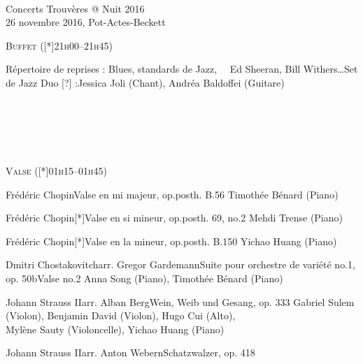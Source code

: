 \documentclass[a4paper,11pt,poets,durations]{ConcProg}
\begin{document}
{
\selectfont

~\\

\begin{programme}{
    Concerts Trouvères @ Nuit 2016
\\  {\normalsize 26 novembre 2016, Pot-Actes-Beckett}
}
~\\
\begin{center}
\textsc{Buffet ([*]21h00--21h45)}
\end{center}
  \begin{part}[]
    \begin{composition}{Répertoire de reprises : Blues, standards de Jazz, ~~Ed Sheeran, Bill Withers\dots}{}{Set de Jazz}{}
      {\small Duo [?] :\newline Jessica Joli (Chant), Andréa Baldoffei (Guitare)}
    \end{composition}\\
~\\
~\\
~\\
\begin{center}
\textsc{Valse ([*]01h15--01h45)}
\end{center}
    \begin{composition}{Frédéric Chopin}{}{Valse en mi majeur, op.posth. B.56}{}
      {\small Timothée Bénard (Piano)}
    \end{composition}
    \begin{composition}{Frédéric Chopin}{}{[*]Valse en si mineur, op.posth. 69, no.2}{}
      {\small Mehdi Trense (Piano)}
    \end{composition}
    \begin{composition}{Frédéric Chopin}{}{[*]Valse en la mineur, op.posth. B.150}{}
      {\small Yichao Huang (Piano)}
    \end{composition}
    \begin{composition}{Dmitri Chostakovitch}{arr. Gregor Gardemann}{Suite pour orchestre de variété no.1, op. 50b}{Valse no.2}
      {\small Anna Song (Piano), Timothée Bénard (Piano)}
    \end{composition}
    \begin{composition}{Johann Strauss II}{arr. Alban Berg}{Wein, Weib und Gesang, op. 333}{}
      {\small Gabriel Sulem (Violon), Benjamin David (Violon), Hugo Cui (Alto),\\Mylène Sauty (Violoncelle), Yichao Huang (Piano)}
    \end{composition}
    \begin{composition}{Johann Strauss II}{arr. Anton Webern}{Schatzwalzer, op. 418}{}

\end{composition}
\end{part}
\end{programme}}
\end{document}
